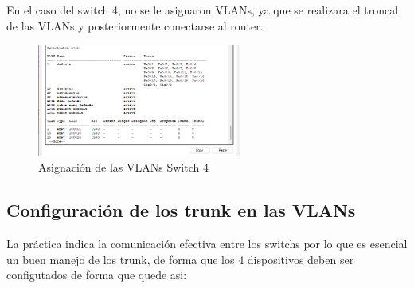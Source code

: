     En el caso del switch 4, no se le asignaron VLANs,  ya que se realizara el troncal de las VLANs y posteriormente conectarse al router.
    \begin{figure}[H]
        \centering
        \includegraphics[width=0.6\textwidth]{img/vlansw4.png}
        \caption{Asignación de las VLANs Switch 4}
        \label{fig:swvla4}
    \end{figure}
    \subsection*{Configuración de los trunk en las VLANs}
    La práctica indica la comunicación efectiva entre los switchs por lo que es esencial un buen manejo de los trunk, de forma que los 4 dispositivos deben ser configutados de forma que quede asi:
    
